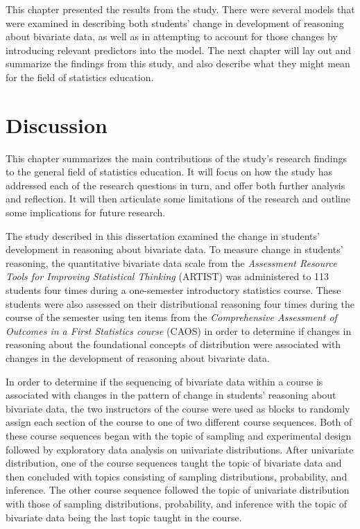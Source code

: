 \documentclass[11pt]{umnthesis}
\begin{document}
This chapter presented the results from the study. There were several models that were examined in describing both students' change in development of reasoning about bivariate data, as well as in attempting to account for those changes by introducing relevant predictors into the model. The next chapter will lay out and summarize the findings from this study, and also describe what they might mean for the field of statistics education.

\hypertarget{discussion}{%
\chapter{Discussion}\label{discussion}}

This chapter summarizes the main contributions of the study's research findings to the general field of statistics education. It will focus on how the study has addressed each of the research questions in turn, and offer both further analysis and reflection. It will then articulate some limitations of the research and outline some implications for future research.

The study described in this dissertation examined the change in students' development in reasoning about bivariate data. To measure change in students' reasoning, the quantitative bivariate data scale from the \emph{Assessment Resource Tools for Improving Statistical Thinking} (ARTIST) was administered to 113 students four times during a one-semester introductory statistics course. These students were also assessed on their distributional reasoning four times during the course of the semester using ten items from the \emph{Comprehensive Assessment of Outcomes in a First Statistics course} (CAOS) in order to determine if changes in reasoning about the foundational concepts of distribution were associated with changes in the development of reasoning about bivariate data.

In order to determine if the sequencing of bivariate data within a course is associated with changes in the pattern of change in students' reasoning about bivariate data, the two instructors of the course were used as blocks to randomly assign each section of the course to one of two different course sequences. Both of these course sequences began with the topic of sampling and experimental design followed by exploratory data analysis on univariate distributions. After univariate distribution, one of the course sequences taught the topic of bivariate data and then concluded with topics consisting of sampling distributions, probability, and inference. The other course sequence followed the topic of univariate distribution with those of sampling distributions, probability, and inference with the topic of bivariate data being the last topic taught in the course.
\end{document}
